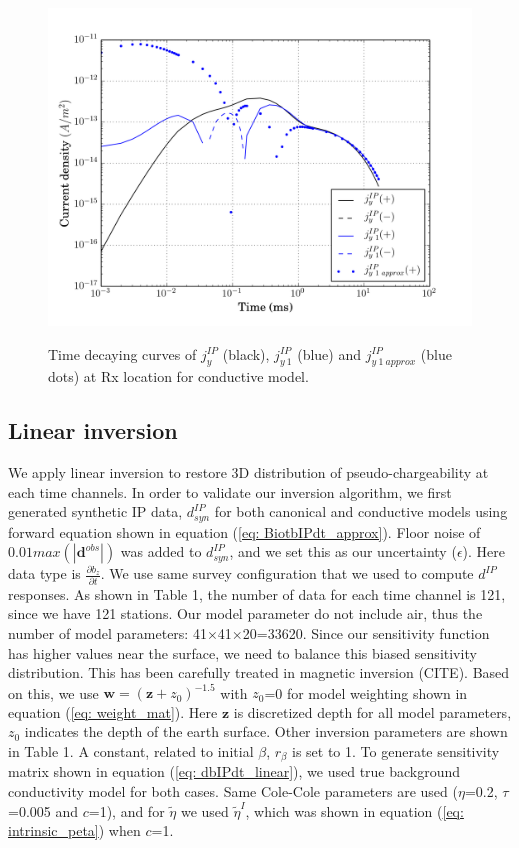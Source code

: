\documentclass[a4paper, 11pt]{article}
\newcommand{\peta}{\tilde{\eta}}
\newcommand{\dip}{d^{IP}}
\begin{document}
\begin{figure}[htb]
  \centering
  \includegraphics[height=0.4\textheight]{figures/synthetic/CurrentIP_decay_case2_1.png} \\
  \caption{Time decaying curves of $j_y^{IP}$ (black), $j_{y \ 1}^{IP}$ (blue) and $j_{y \ 1 \ approx}^{IP}$ (blue dots) at Rx location for conductive model. }
  \label{F: currentIP_case2_decay}
\end{figure}
\clearpage

\subsection{Linear inversion}
We apply linear inversion to restore 3D distribution of pseudo-chargeability at each time channels. In order to validate our inversion algorithm, we first generated synthetic IP data, $d^{IP}_{syn}$ for both canonical and conductive models using forward equation shown in equation (\ref{eq: BiotbIPdt_approx}). Floor noise of $0.01max(|\mathbf{d}^{obs}|)$ was added to $\dip_{syn}$, and we set this as our uncertainty ($\epsilon$). Here data type is $\frac{\partial b_z}{\partial t}$. We use same survey configuration that we used to compute $d^{IP}$ responses. As shown in Table 1, the number of data for each time channel is 121, since we have 121 stations. Our model parameter do not include air, thus the number of model parameters: 41$\times$41$\times$20=33620. Since our sensitivity function has higher values near the surface, we need to balance this biased sensitivity distribution. This has been carefully treated in magnetic inversion (CITE). Based on this, we use $\mathbf{w} = (\mathbf{z}+z_0)^{-1.5}$ with $z_0$=0 for model weighting shown in equation (\ref{eq: weight_mat}). Here $\mathbf{z}$ is discretized depth for all model parameters, $z_0$ indicates the depth of the earth surface. Other inversion parameters are shown in Table 1. A constant, related to initial $\beta$, $r_{\beta}$ is set to 1. To generate sensitivity matrix shown in equation (\ref{eq: dbIPdt_linear}), we used true background conductivity model for both cases. Same Cole-Cole parameters are used ($\eta$=0.2, $\tau$=0.005 and $c$=1), and for $\peta$ we used $\peta^{I}$, which was shown in equation (\ref{eq: intrinsic_peta}) when $c$=1.
\end{document}

